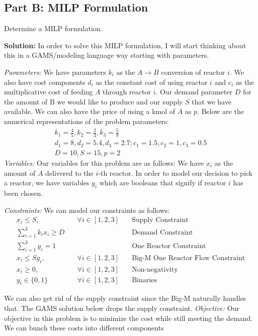 \documentclass[11pt]{article}
\begin{document}
\subsection{Part B: MILP Formulation}
Determine a MILP formulation.

\textbf{Solution:}
In order to solve this MILP formulation, I will start thinking about this in a GAMS/modeling language way starting with parameters.

\textit{Parameters:} 
We have parameters $k_i$ as the $A \rightarrow B$ conversion of reactor $i$.
We also have cost components $d_i$ as the constant cost of using reactor $i$ and $c_i$ as the multiplicative cost of feeding $A$ through reactor $i$.
Our demand parameter $D$ for the amount of B we would like to produce and our supply $S$ that we have available.
We can also have the price of using a kmol of $A$ as $p$.
Below are the numerical representations of the problem parameters:
\begin{align*}
  k_1=\frac{4}{5}, k_2=\frac{2}{3}, k_3=\frac{5}{9} \\
  d_1=8, d_2=5.4, d_3=2.7; c_1=1.5, c_2=1, c_3=0.5 \\
  D = 10, S=15, p=2
\end{align*}
\textit{Variables:}
Our variables for this problem are as follows:
We have $x_{i}$ as the amount of $A$ delivered to the $i$-th reactor.
In order to model our decision to pick a reactor, we have variables $y_i$ which are booleans that signify if reactor $i$ has been chosen.

\textit{Constraints:}
We can model our constraints as follows:
\begin{align*}
  x_i \leq S, & \quad \forall i \in [1,2,3] & \quad \text{Supply Constraint} \\
  \sum_{i=1}^{3} k_i x_i \geq D & \quad & \quad \text{Demand Constraint} \\
  \sum_{i=1}^{3} y_i = 1 & \quad & \quad \text{One Reactor Constraint} \\
  x_i \leq S y_i, & \quad \forall i \in [1,2,3] & \quad \text{Big-M One Reactor Flow Constraint} \\
  x_i \geq 0, & \quad \forall i \in [1,2,3] & \quad \text{Non-negativity} \\
  y_i \in \{ 0,1 \}  & \quad \forall i \in [1,2,3] & \quad \text{Binaries}
\end{align*}

We can also get rid of the supply constraint since the Big-M naturally handles that.
The GAMS solution below drops the supply constraint.
\textit{Objective:}
Our objective in this problem is to minimize the cost while still meeting the demand.
We can bunch these costs into different components
\end{document}
